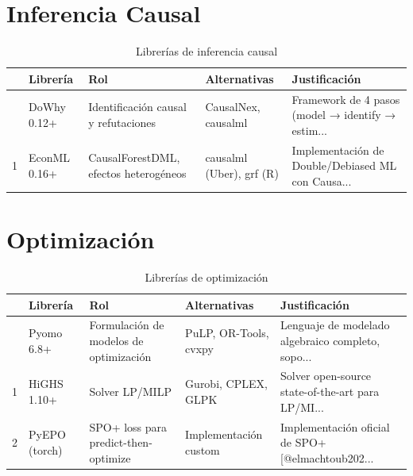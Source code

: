 \documentclass[
  spanish,
  11pt,
  letterpaper,
]{scrbook}
\theoremstyle{plain}
\theoremstyle{remark}
\begin{document}
\section{Inferencia Causal}\label{inferencia-causal}

{

\begin{longtable}[]{@{}lllll@{}}

\caption{\label{tbl-causal-stack}Librerías de inferencia causal}

\tabularnewline

\toprule\noalign{}
& Librería & Rol & Alternativas & Justificación \\
\midrule\noalign{}
\endhead
\bottomrule\noalign{}
\endlastfoot
0 & DoWhy 0.12+ & Identificación causal y refutaciones & CausalNex,
causalml & Framework de 4 pasos (model → identify → estim... \\
1 & EconML 0.16+ & CausalForestDML, efectos heterogéneos & causalml
(Uber), grf (R) & Implementación de Double/Debiased ML con Causa... \\

\end{longtable}

}

\section{Optimización}\label{optimizaciuxf3n}

{

\begin{longtable}[]{@{}lllll@{}}

\caption{\label{tbl-optim-stack}Librerías de optimización}

\tabularnewline

\toprule\noalign{}
& Librería & Rol & Alternativas & Justificación \\
\midrule\noalign{}
\endhead
\bottomrule\noalign{}
\endlastfoot
0 & Pyomo 6.8+ & Formulación de modelos de optimización & PuLP,
OR-Tools, cvxpy & Lenguaje de modelado algebraico completo, sopo... \\
1 & HiGHS 1.10+ & Solver LP/MILP & Gurobi, CPLEX, GLPK & Solver
open-source state-of-the-art para LP/MI... \\
2 & PyEPO (torch) & SPO+ loss para predict-then-optimize &
Implementación custom & Implementación oficial de SPO+
{[}@elmachtoub202... \\

\end{longtable}

}
\end{document}
